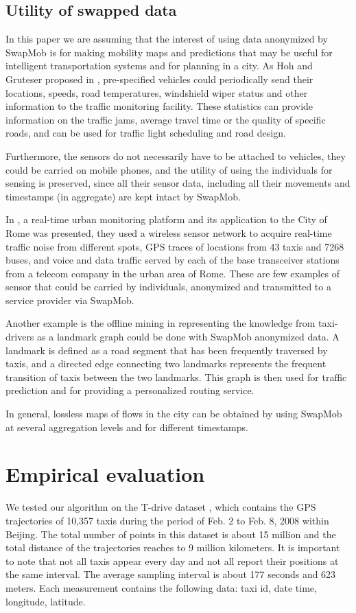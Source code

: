 \documentclass{llncs}
\begin{document}
\subsection{Utility of swapped data}\label{sect:util}
In this paper we are assuming that the interest of using data anonymized by SwapMob is for making mobility maps and predictions that may be useful for intelligent transportation systems and for planning in a city.
As Hoh and Gruteser proposed in \cite{Hoh2005}, pre-specified vehicles could periodically send their locations, speeds, road temperatures, windshield wiper status and other information to the traffic monitoring facility. These statistics can provide information on the traffic jams, average travel time or the quality of specific roads, and can be used for traffic light scheduling and road design.

Furthermore, the sensors do not necessarily have to be attached to vehicles, they could be carried on mobile phones, and the utility of using the individuals for sensing is preserved, since all their sensor data, including all their movements and timestamps (in aggregate) are kept intact by SwapMob.


In \cite{Calabrese2011}, a real-time urban monitoring platform and its application to the City of Rome was presented, they used
a wireless sensor network to acquire real-time traffic noise from different spots, GPS traces of locations from 43 taxis and 7268 buses, and voice and data traffic served by each of the base transceiver stations from a telecom company in the urban area of Rome. These are few examples of sensor that could be carried by individuals, anonymized and transmitted to a service provider via SwapMob.


Another example is the offline mining in \cite{Yuan2011} representing the knowledge from taxi-drivers as a landmark graph could be done with SwapMob anonymized data. A landmark is defined as a road segment that has been frequently traversed by taxis, and a directed edge connecting two landmarks represents the frequent transition of taxis between the two landmarks. This graph is then used for traffic prediction and for providing a personalized routing service.


In general, lossless maps of flows in the city can be obtained by using SwapMob at several aggregation levels and for different timestamps.



\section{Empirical evaluation}
We tested our algorithm on the T-drive dataset
\cite{Yuan2010},\cite{Yuan2011} which contains the GPS trajectories of
10,357 taxis during the period of Feb. 2 to Feb. 8, 2008 within
Beijing. The total number of points in this dataset is about 15
million and the total distance of the trajectories reaches to 9
million kilometers. It is important to note that not all taxis appear
every day and not all report their positions at the same interval. The
average sampling interval is about 177 seconds and 623 meters. Each
measurement contains the following data: taxi id, date time,
longitude, latitude.
\end{document}
